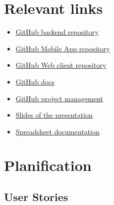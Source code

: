 \documentclass[./main.tex]{subfiles}
\begin{document}
\section{Relevant links}

\begin{itemize}
	\item \href{https://github.com/commed-it/backend}{GitHub backend repository}
	\item \href{https://github.com/commed-it/mobile-app}{GitHub Mobile App repository}
	\item \href{https://github.com/commed-it/web-client}{GitHub Web client repository}
	\item \href{https://github.com/commed-it/docs}{GitHub docs}
	\item \href{https://github.com/orgs/commed-it/projects/1}{GitHub project management}
	\item \href{https://drive.google.com/drive/folders/15iM-Fm6krEBcHkVyaqSUfjJMY1MKBMm6?usp=sharing}{Slides of the presentation}
	\item \href{https://docs.google.com/spreadsheets/d/1qyKpYXf7lZ2p7q09JHzv7e7yGVBiPEqGNHhwPsFYcXc/edit?usp=sharing}{Spreadsheet documentation}
\end{itemize}

\section{Planification}

\subsection{User Stories}
\end{document}
